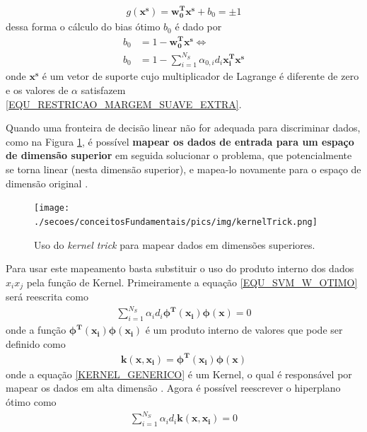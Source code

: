\begin{align}
g(\mathbf{x^{s}}) = \mathbf{w_{0}^{T}}\mathbf{x^{s}} + b_{0} = \pm 1
\end{align}
dessa forma o cálculo do bias ótimo \(b_{0}\) é dado por
\begin{align}
b_{0} &= 1 - \mathbf{w_{0}^{T}}\mathbf{x^{s}} \Leftrightarrow \\
b_{0} &= 1 - \sum\limits_{i=1}^{N_{S}} \alpha_{0,i}d_{i}\mathbf{x_{i}^{T}}\mathbf{x^{s}} 
\end{align}
onde \(\mathbf{x^{s}}\) é um vetor de suporte cujo multiplicador de Lagrange é diferente de zero e os valores de \(\alpha\) satisfazem \eqref{EQU_RESTRICAO_MARGEM_SUAVE_EXTRA}.

Quando uma fronteira de decisão linear não for adequada para discriminar dados, como na Figura \ref{FIGURA_SVM_Caso_Nao_Separavel_KERNEL_TRICK}, é possível \textbf{mapear os dados de entrada para um espaço de dimensão superior} em seguida solucionar o problema, que potencialmente se torna linear (nesta dimensão superior), e mapea-lo novamente para o espaço de dimensão original \cite{Haykin2007}.
\begin{figure}[H]
  \centering
  \caption{Uso do \emph{kernel trick} para mapear dados em dimensões superiores.}
  \texttt{[image: ./secoes/conceitosFundamentais/pics/img/kernelTrick.png]}
  \label{FIGURA_SVM_Caso_Nao_Separavel_KERNEL_TRICK}
\end{figure}
Para usar este mapeamento basta substituir o uso do produto interno dos dados \(x_{i}x_{j}\) pela função de Kernel. Primeiramente a equação \eqref{EQU_SVM_W_OTIMO} será reescrita como
\begin{align}
\sum\limits_{i=1}^{N_{S}} \alpha_{i}d_{i}\bm{\phi^{T}}(\bm{x_{i}})\bm{\phi}(\bm{x}) = 0
\end{align}
onde a função \(\bm{\phi^{T}}(\bm{x_{i}})\bm{\phi}(\bm{x_{i}})\) é um produto interno de valores que pode ser definido como
\begin{align}
\mathbf{k}(\mathbf{x}, \mathbf{x_{i}}) = \bm{\phi^{T}}(\bm{x_{i}})\bm{\phi}(\bm{x}) \label{KERNEL_GENERICO}
\end{align}
onde a equação \eqref{KERNEL_GENERICO} é um Kernel, o qual é responsável por mapear os dados em alta dimensão \cite{Shawe2004}. Agora é possível reescrever o hiperplano ótimo como
\begin{align}
\sum\limits_{i=1}^{N_{S}} \alpha_{i}d_{i}\mathbf{k}(\mathbf{x}, \mathbf{x_{i}}) = 0
\end{align}

